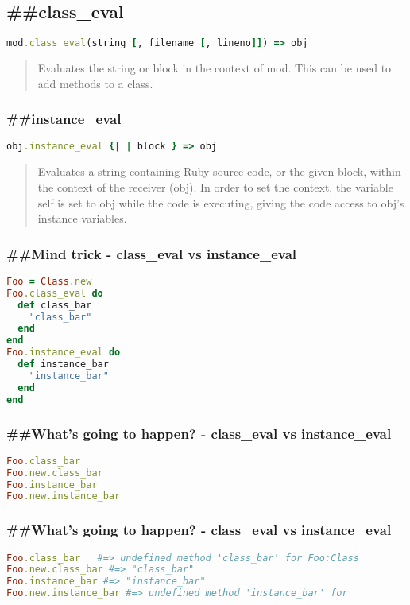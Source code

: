 \documentclass[serif,mathserif]{article}
\begin{document}
\subsection{\#\#class\_eval}
\begin{lstlisting}[language=ruby]
mod.class_eval(string [, filename [, lineno]]) => obj
\end{lstlisting}


\begin{quote}
Evaluates the string or block in the context of mod. This can be used to add methods to a class.
\end{quote}


\subsubsection{\#\#instance\_eval}
\begin{lstlisting}[language=ruby]
obj.instance_eval {| | block } => obj
\end{lstlisting}

\begin{quote}
Evaluates a string containing Ruby source code, or the given block, within the context of the receiver (obj). In order to set the context, the variable self is set to obj while the code is executing, giving the code access to obj’s instance variables.
\end{quote}

\subsubsection{\#\#Mind trick - class\_eval vs instance\_eval}

\begin{lstlisting}[language=ruby]
Foo = Class.new
Foo.class_eval do
  def class_bar
    "class_bar"
  end
end
Foo.instance_eval do
  def instance_bar
    "instance_bar"
  end
end
\end{lstlisting}

\subsubsection{\#\#What's going to happen? - class\_eval vs instance\_eval}
\begin{lstlisting}[language=ruby]
Foo.class_bar
Foo.new.class_bar 
Foo.instance_bar
Foo.new.instance_bar
\end{lstlisting}


\subsubsection{\#\#What's going to happen? - class\_eval vs instance\_eval}
\begin{lstlisting}[language=ruby]
Foo.class_bar   #=> undefined method 'class_bar' for Foo:Class
Foo.new.class_bar #=> "class_bar"
Foo.instance_bar #=> "instance_bar"
Foo.new.instance_bar #=> undefined method 'instance_bar' for
\end{lstlisting}
\end{document}
